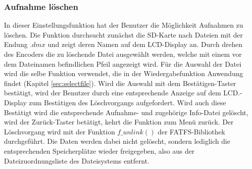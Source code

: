 \subsubsection{Aufnahme löschen}
In dieser Einstellungsfunktion hat der Benutzer die Möglichkeit Aufnahmen zu löschen. Die Funktion durchsucht zunächst die SD-Karte nach Dateien mit der Endung $.dmx$ und zeigt deren Namen auf dem LCD-Display an. Durch drehen des Encoders die zu löschende Datei ausgewählt werden, welche mit einem vor dem Dateinamen befindlichen Pfeil angezeigt wird. Für die Auswahl der Datei wird die selbe Funktion verwendet, die in der Wiedergabefunktion Anwendung findet (Kapitel \ref{sec:selectfile}). Wird die Auswahl mit dem Bestätigen-Taster bestätigt, wird der Benutzer durch eine entsprechende Anzeige auf dem LCD.-Display zum Bestätigen des Löschvorgangs aufgefordert. Wird auch diese Bestätigt wird die entsprechende Aufnahme- und zugehörige Info-Datei gelöscht, wird der Zurück-Taster betätigt, kehrt die Funktion zum Menü zurück. Der Löschvorgang wird mit der Funktion $f\_unlink()$ der FATFS-Bibliothek durchgeführt. Die Daten werden dabei nicht gelöscht, sondern lediglich die entsprechenden Speicherplätze wieder freigegeben, also aus der Dateizuordnungsliste des Dateisystems entfernt.